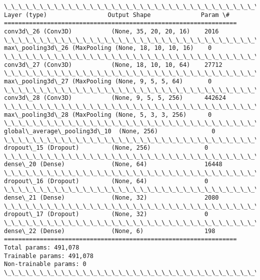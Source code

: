 \documentclass[11pt]{article}
\begin{document}
    \begin{Verbatim}[commandchars=\\\{\}]
\_\_\_\_\_\_\_\_\_\_\_\_\_\_\_\_\_\_\_\_\_\_\_\_\_\_\_\_\_\_\_\_\_\_\_\_\_\_\_\_\_\_\_\_\_\_\_\_\_\_\_\_\_\_\_\_\_\_\_\_\_\_\_\_\_
Layer (type)                 Output Shape              Param \#   
=================================================================
conv3d\_26 (Conv3D)           (None, 35, 20, 20, 16)    2016      
\_\_\_\_\_\_\_\_\_\_\_\_\_\_\_\_\_\_\_\_\_\_\_\_\_\_\_\_\_\_\_\_\_\_\_\_\_\_\_\_\_\_\_\_\_\_\_\_\_\_\_\_\_\_\_\_\_\_\_\_\_\_\_\_\_
max\_pooling3d\_26 (MaxPooling (None, 18, 10, 10, 16)    0         
\_\_\_\_\_\_\_\_\_\_\_\_\_\_\_\_\_\_\_\_\_\_\_\_\_\_\_\_\_\_\_\_\_\_\_\_\_\_\_\_\_\_\_\_\_\_\_\_\_\_\_\_\_\_\_\_\_\_\_\_\_\_\_\_\_
conv3d\_27 (Conv3D)           (None, 18, 10, 10, 64)    27712     
\_\_\_\_\_\_\_\_\_\_\_\_\_\_\_\_\_\_\_\_\_\_\_\_\_\_\_\_\_\_\_\_\_\_\_\_\_\_\_\_\_\_\_\_\_\_\_\_\_\_\_\_\_\_\_\_\_\_\_\_\_\_\_\_\_
max\_pooling3d\_27 (MaxPooling (None, 9, 5, 5, 64)       0         
\_\_\_\_\_\_\_\_\_\_\_\_\_\_\_\_\_\_\_\_\_\_\_\_\_\_\_\_\_\_\_\_\_\_\_\_\_\_\_\_\_\_\_\_\_\_\_\_\_\_\_\_\_\_\_\_\_\_\_\_\_\_\_\_\_
conv3d\_28 (Conv3D)           (None, 9, 5, 5, 256)      442624    
\_\_\_\_\_\_\_\_\_\_\_\_\_\_\_\_\_\_\_\_\_\_\_\_\_\_\_\_\_\_\_\_\_\_\_\_\_\_\_\_\_\_\_\_\_\_\_\_\_\_\_\_\_\_\_\_\_\_\_\_\_\_\_\_\_
max\_pooling3d\_28 (MaxPooling (None, 5, 3, 3, 256)      0         
\_\_\_\_\_\_\_\_\_\_\_\_\_\_\_\_\_\_\_\_\_\_\_\_\_\_\_\_\_\_\_\_\_\_\_\_\_\_\_\_\_\_\_\_\_\_\_\_\_\_\_\_\_\_\_\_\_\_\_\_\_\_\_\_\_
global\_average\_pooling3d\_10  (None, 256)               0         
\_\_\_\_\_\_\_\_\_\_\_\_\_\_\_\_\_\_\_\_\_\_\_\_\_\_\_\_\_\_\_\_\_\_\_\_\_\_\_\_\_\_\_\_\_\_\_\_\_\_\_\_\_\_\_\_\_\_\_\_\_\_\_\_\_
dropout\_15 (Dropout)         (None, 256)               0         
\_\_\_\_\_\_\_\_\_\_\_\_\_\_\_\_\_\_\_\_\_\_\_\_\_\_\_\_\_\_\_\_\_\_\_\_\_\_\_\_\_\_\_\_\_\_\_\_\_\_\_\_\_\_\_\_\_\_\_\_\_\_\_\_\_
dense\_20 (Dense)             (None, 64)                16448     
\_\_\_\_\_\_\_\_\_\_\_\_\_\_\_\_\_\_\_\_\_\_\_\_\_\_\_\_\_\_\_\_\_\_\_\_\_\_\_\_\_\_\_\_\_\_\_\_\_\_\_\_\_\_\_\_\_\_\_\_\_\_\_\_\_
dropout\_16 (Dropout)         (None, 64)                0         
\_\_\_\_\_\_\_\_\_\_\_\_\_\_\_\_\_\_\_\_\_\_\_\_\_\_\_\_\_\_\_\_\_\_\_\_\_\_\_\_\_\_\_\_\_\_\_\_\_\_\_\_\_\_\_\_\_\_\_\_\_\_\_\_\_
dense\_21 (Dense)             (None, 32)                2080      
\_\_\_\_\_\_\_\_\_\_\_\_\_\_\_\_\_\_\_\_\_\_\_\_\_\_\_\_\_\_\_\_\_\_\_\_\_\_\_\_\_\_\_\_\_\_\_\_\_\_\_\_\_\_\_\_\_\_\_\_\_\_\_\_\_
dropout\_17 (Dropout)         (None, 32)                0         
\_\_\_\_\_\_\_\_\_\_\_\_\_\_\_\_\_\_\_\_\_\_\_\_\_\_\_\_\_\_\_\_\_\_\_\_\_\_\_\_\_\_\_\_\_\_\_\_\_\_\_\_\_\_\_\_\_\_\_\_\_\_\_\_\_
dense\_22 (Dense)             (None, 6)                 198       
=================================================================
Total params: 491,078
Trainable params: 491,078
Non-trainable params: 0
\_\_\_\_\_\_\_\_\_\_\_\_\_\_\_\_\_\_\_\_\_\_\_\_\_\_\_\_\_\_\_\_\_\_\_\_\_\_\_\_\_\_\_\_\_\_\_\_\_\_\_\_\_\_\_\_\_\_\_\_\_\_\_\_\_

    \end{Verbatim}
\end{document}

